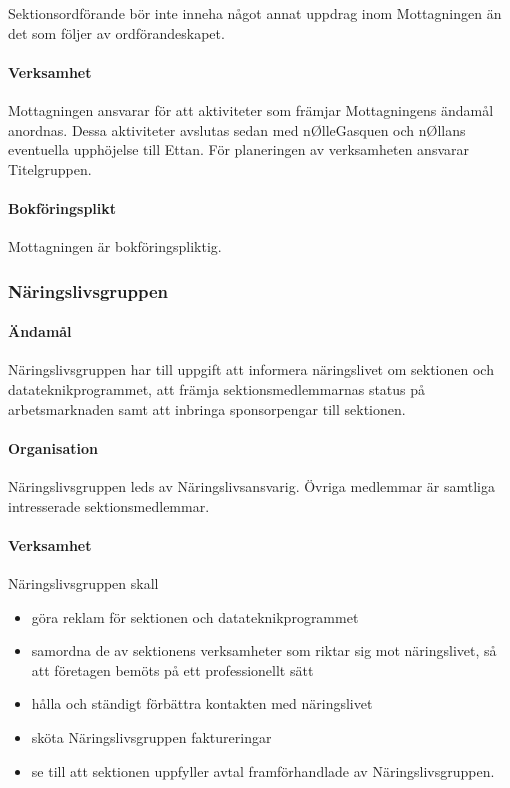 \documentclass[a4paper,12pt]{article}
\begin{document}
Sektionsordförande bör inte inneha något annat uppdrag inom Mottagningen än det som följer av ordförandeskapet.

\paragraph{Verksamhet}

Mottagningen ansvarar för att aktiviteter som främjar Mottagningens ändamål anordnas. Dessa aktiviteter avslutas sedan med nØlleGasquen och nØllans eventuella upphöjelse till Ettan. För planeringen av verksamheten ansvarar Titelgruppen.

\paragraph{Bokföringsplikt}

Mottagningen är bokföringspliktig.

\subsubsection{Näringslivsgruppen}

\paragraph{Ändamål}

Näringslivsgruppen har till uppgift att informera näringslivet om sektionen och datateknikprogrammet, att främja sektionsmedlemmarnas status på arbetsmarknaden samt att inbringa sponsorpengar till sektionen.

\paragraph{Organisation}

Näringslivsgruppen leds av Näringslivsansvarig. Övriga medlemmar är samtliga intresserade sektionsmedlemmar.

\paragraph{Verksamhet}

Näringslivsgruppen skall

\begin{itemize}
  \item göra reklam för sektionen och datateknikprogrammet
  \item samordna de av sektionens verksamheter som riktar sig mot näringslivet, så att företagen bemöts på ett professionellt sätt
  \item hålla och ständigt förbättra kontakten med näringslivet
  \item sköta Näringslivsgruppen faktureringar
  \item se till att sektionen uppfyller avtal framförhandlade av Näringslivsgruppen.
\end{itemize}
\end{document}
